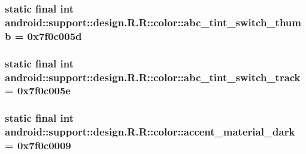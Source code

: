 \hypertarget{classandroid_1_1support_1_1design_1_1_r_1_1color_3a6fadd9d2e5f11e3f326f1962459faa}{
\subsubsection[{abc\_\-tint\_\-switch\_\-thumb}]{\setlength{\rightskip}{0pt plus 5cm}static final int android::support::design.R.R::color::abc\_\-tint\_\-switch\_\-thumb = 0x7f0c005d}}
\label{classandroid_1_1support_1_1design_1_1_r_1_1color_3a6fadd9d2e5f11e3f326f1962459faa}


\hypertarget{classandroid_1_1support_1_1design_1_1_r_1_1color_6dd331bc2f25d0eb6ab09bceed87a37e}{
\subsubsection[{abc\_\-tint\_\-switch\_\-track}]{\setlength{\rightskip}{0pt plus 5cm}static final int android::support::design.R.R::color::abc\_\-tint\_\-switch\_\-track = 0x7f0c005e}}
\label{classandroid_1_1support_1_1design_1_1_r_1_1color_6dd331bc2f25d0eb6ab09bceed87a37e}


\hypertarget{classandroid_1_1support_1_1design_1_1_r_1_1color_a83f206c71151465df25d30831634248}{
\subsubsection[{accent\_\-material\_\-dark}]{\setlength{\rightskip}{0pt plus 5cm}static final int android::support::design.R.R::color::accent\_\-material\_\-dark = 0x7f0c0009}}
\label{classandroid_1_1support_1_1design_1_1_r_1_1color_a83f206c71151465df25d30831634248}


